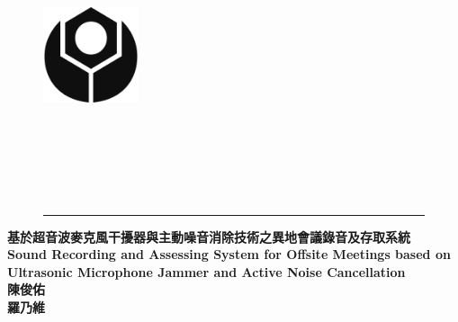 \begin{titlepage}
    \begin{singlespace}
        \begin{center}
            \begin{figure}[htb]
                \begin{minipage}[c]{0cm} 
                    \raggedright
                    \includegraphics[width=1.1in]{style/logo.pdf}
                \end{minipage}
                \begin{minipage}[c]{\textwidth}
                    \centering
                    \\
                    \vspace{1cm}
                    \\
                    \vspace{1cm}
                    \\
                \end{minipage}
                \begin{minipage}[b]{\textwidth}
                    \raggedleft
                    \vspace{1cm}
                    \\
                \end{minipage}
                \rule{16cm}{3pt}
            \end{figure}
            \vspace{1.5cm}
            \bf\LARGE{基於超音波麥克風干擾器與主動噪音消除技術之異地會議錄音及存取系統}\\
            \vspace{0.5cm}
            \bf\LARGE{Sound Recording and Assessing System for Offsite Meetings based on Ultrasonic Microphone Jammer and Active Noise Cancellation}\\
            \vfill
            \hspace{4.5cm}  \Large{陳俊佑} \hfill \makebox[0cm][r]{}\\
            \vspace{0.5cm}
            \hspace{4.5cm}  \Large{羅乃維}  \hfill \makebox[0cm][r]{}\\
            \vfill
        \end{center}
    \end{singlespace}
\end{titlepage}
\clearpage
\restoregeometry